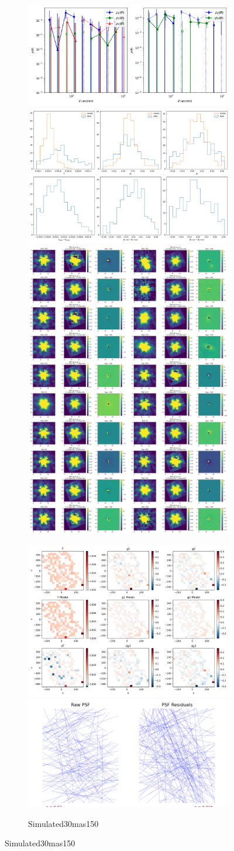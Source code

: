 \documentclass[a4 paper]{article}
\numberwithin{equation}{section}
\newcommand{\0}{\mathbf{0}}
\begin{document}
\begin{figure}[!h]
  \begin{subfigure}{\linewidth}
  \includegraphics[width=.3\linewidth]{Simulated30mas150/piff_rho.png}\hfill
  \includegraphics[width=.3\linewidth]{Simulated30mas150/piff_shapes.png}\hfill
  \includegraphics[width=.3\linewidth]{Simulated30mas150/piff_stars.png}
  \end{subfigure}\par\medskip
  \begin{subfigure}{\linewidth}
  \includegraphics[width=.3\linewidth]{Simulated30mas150/piff_twod.png}\hfill
  \includegraphics[width=.3\linewidth]{Simulated30mas150/piff_whisker.png}\hfill
  \caption{Simulated30mas150}
  \end{subfigure}\par\medskip


\end{figure}
\end{document}
